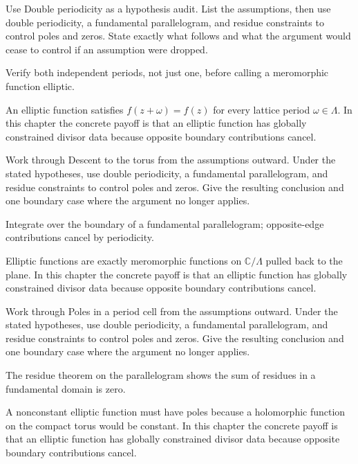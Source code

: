 \begin{exercise}\label{exr:iv28-01}
Use Double periodicity as a hypothesis audit. List the assumptions, then use double periodicity, a fundamental parallelogram, and residue constraints to control poles and zeros. State exactly what follows and what the argument would cease to control if an assumption were dropped.
\end{exercise}
\begin{hint}
Verify both independent periods, not just one, before calling a meromorphic function elliptic.
\end{hint}
\begin{solution}
An elliptic function satisfies $f(z+\omega)=f(z)$ for every lattice period $\omega\in\Lambda$. In this chapter the concrete payoff is that an elliptic function has globally constrained divisor data because opposite boundary contributions cancel.
\end{solution}

\begin{exercise}\label{exr:iv28-02}
Work through Descent to the torus from the assumptions outward. Under the stated hypotheses, use double periodicity, a fundamental parallelogram, and residue constraints to control poles and zeros. Give the resulting conclusion and one boundary case where the argument no longer applies.
\end{exercise}
\begin{hint}
Integrate over the boundary of a fundamental parallelogram; opposite-edge contributions cancel by periodicity.
\end{hint}
\begin{solution}
Elliptic functions are exactly meromorphic functions on $\mathbb C/\Lambda$ pulled back to the plane. In this chapter the concrete payoff is that an elliptic function has globally constrained divisor data because opposite boundary contributions cancel.
\end{solution}

\begin{exercise}\label{exr:iv28-03}
Work through Poles in a period cell from the assumptions outward. Under the stated hypotheses, use double periodicity, a fundamental parallelogram, and residue constraints to control poles and zeros. Give the resulting conclusion and one boundary case where the argument no longer applies.
\end{exercise}
\begin{hint}
The residue theorem on the parallelogram shows the sum of residues in a fundamental domain is zero.
\end{hint}
\begin{solution}
A nonconstant elliptic function must have poles because a holomorphic function on the compact torus would be constant. In this chapter the concrete payoff is that an elliptic function has globally constrained divisor data because opposite boundary contributions cancel.
\end{solution}

